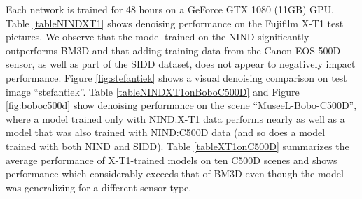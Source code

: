 Each network is trained for 48 hours on a GeForce GTX 1080 (11GB) \ac{GPU}. %
Table \ref{tableNINDXT1} shows denoising performance on the Fujifilm X-T1 test pictures. We observe that the model trained on the \ac{NIND} significantly outperforms \ac{BM3D} and that adding training data from the Canon EOS 500D sensor, as well as part of the \ac{SIDD} dataset, does not appear to negatively impact performance. Figure \ref{fig:stefantiek} shows a visual denoising comparison on test image ``stefantiek''. Table \ref{tableNINDXT1onBoboC500D} and Figure \ref{fig:boboc500d} show denoising performance on the scene ``MuseeL-Bobo-C500D'', where a model trained only with \ac{NIND}:\ac{X-T1} data performs nearly as well as a model that was also trained with \ac{NIND}:\ac{C500D} data (and so does a model trained with both \ac{NIND} and \ac{SIDD}). Table \ref{tableXT1onC500D} summarizes the average performance of \ac{X-T1}-trained models on ten \ac{C500D} scenes and shows performance which considerably exceeds that of \ac{BM3D} even though the model was generalizing for a different sensor type.


